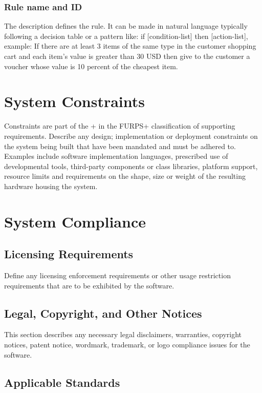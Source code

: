 \subsubsection{Rule name and ID}

The description defines the rule. It can be made in natural language typically following a decision table or a pattern like:  if [condition-list] then [action-list], example: 
If there are at least 3 items of the same type in the customer shopping cart and each item’s value is greater than 30 USD then give to the customer a voucher whose value is 10 percent of the cheapest item.


\section{System Constraints}

Constraints are part of the + in the FURPS+ classification of supporting requirements. Describe any design; implementation or deployment constraints on the system being built that have been mandated and must be adhered to. Examples include software implementation languages, prescribed use of developmental tools, third-party components or class libraries, platform support, resource limits and requirements on the shape, size or weight of the resulting hardware housing the system.

\section{System Compliance}

\subsection{Licensing Requirements}

Define any licensing enforcement requirements or other usage restriction requirements that are to be exhibited by the software.

\subsection{Legal, Copyright, and Other Notices}

This section describes any necessary legal disclaimers, warranties, copyright notices, patent notice, wordmark, trademark, or logo compliance issues for the software.

\subsection{Applicable Standards}


